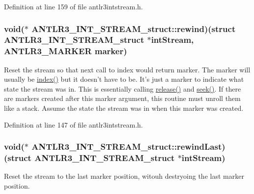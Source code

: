 Definition at line 159 of file antlr3intstream.\-h.

\hypertarget{struct_a_n_t_l_r3___i_n_t___s_t_r_e_a_m__struct_a8fa6f22f95f34f15d7d085fa4bddfcf8}{
\subsubsection[{rewind}]{\setlength{\rightskip}{0pt plus 5cm}void($\ast$ A\-N\-T\-L\-R3\-\_\-\-I\-N\-T\-\_\-\-S\-T\-R\-E\-A\-M\-\_\-struct\-::rewind)(struct {\bf A\-N\-T\-L\-R3\-\_\-\-I\-N\-T\-\_\-\-S\-T\-R\-E\-A\-M\-\_\-struct} $\ast$int\-Stream, {\bf A\-N\-T\-L\-R3\-\_\-\-M\-A\-R\-K\-E\-R} marker)}}\label{struct_a_n_t_l_r3___i_n_t___s_t_r_e_a_m__struct_a8fa6f22f95f34f15d7d085fa4bddfcf8}
Reset the stream so that next call to index would return marker. The marker will usually be \hyperlink{struct_a_n_t_l_r3___i_n_t___s_t_r_e_a_m__struct_a5141407fe8b50ff4e87f617811fd54fc}{index()} but it doesn't have to be. It's just a marker to indicate what state the stream was in. This is essentially calling \hyperlink{struct_a_n_t_l_r3___i_n_t___s_t_r_e_a_m__struct_aaf72411c29dcfa48673babf667797ba6}{release()} and \hyperlink{struct_a_n_t_l_r3___i_n_t___s_t_r_e_a_m__struct_a052f31580e00cb4200a6234dfcca600b}{seek()}. If there are markers created after this marker argument, this routine must unroll them like a stack. Assume the state the stream was in when this marker was created. 

Definition at line 147 of file antlr3intstream.\-h.

\hypertarget{struct_a_n_t_l_r3___i_n_t___s_t_r_e_a_m__struct_a5bd359e0dbc0dd65c226d573776f33b6}{
\subsubsection[{rewind\-Last}]{\setlength{\rightskip}{0pt plus 5cm}void($\ast$ A\-N\-T\-L\-R3\-\_\-\-I\-N\-T\-\_\-\-S\-T\-R\-E\-A\-M\-\_\-struct\-::rewind\-Last)(struct {\bf A\-N\-T\-L\-R3\-\_\-\-I\-N\-T\-\_\-\-S\-T\-R\-E\-A\-M\-\_\-struct} $\ast$int\-Stream)}}\label{struct_a_n_t_l_r3___i_n_t___s_t_r_e_a_m__struct_a5bd359e0dbc0dd65c226d573776f33b6}
Reset the stream to the last marker position, witouh destryoing the last marker position. 

